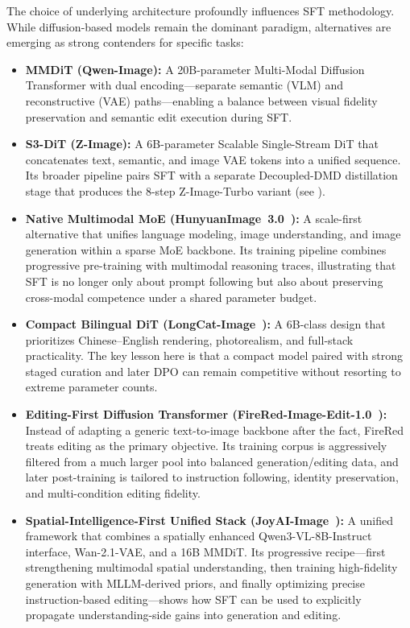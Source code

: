 The choice of underlying architecture profoundly influences SFT methodology. While diffusion-based models remain the dominant paradigm, alternatives are emerging as strong contenders for specific tasks:
\begin{itemize}[leftmargin=*,itemsep=2pt]
    \item \textbf{MMDiT (Qwen-Image):} A 20B-parameter Multi-Modal Diffusion Transformer with dual encoding---separate semantic (VLM) and reconstructive (VAE) paths---enabling a balance between visual fidelity preservation and semantic edit execution during SFT.
    \item \textbf{S3-DiT (Z-Image):} A 6B-parameter Scalable Single-Stream DiT that concatenates text, semantic, and image VAE tokens into a unified sequence. Its broader pipeline pairs SFT with a separate Decoupled-DMD distillation stage that produces the 8-step Z-Image-Turbo variant (see ).
    \item \textbf{Native Multimodal MoE (HunyuanImage~3.0~\citep{cao2025hunyuanimage}):} A scale-first alternative that unifies language modeling, image understanding, and image generation within a sparse MoE backbone. Its training pipeline combines progressive pre-training with multimodal reasoning traces, illustrating that SFT is no longer only about prompt following but also about preserving cross-modal competence under a shared parameter budget.
    \item \textbf{Compact Bilingual DiT (LongCat-Image~\citep{team2025longcat}):} A 6B-class design that prioritizes Chinese--English rendering, photorealism, and full-stack practicality. The key lesson here is that a compact model paired with strong staged curation and later DPO can remain competitive without resorting to extreme parameter counts.
    \item \textbf{Editing-First Diffusion Transformer (FireRed-Image-Edit-1.0~\citep{team2026firered}):} Instead of adapting a generic text-to-image backbone after the fact, FireRed treats editing as the primary objective. Its training corpus is aggressively filtered from a much larger pool into balanced generation/editing data, and later post-training is tailored to instruction following, identity preservation, and multi-condition editing fidelity.
    \item \textbf{Spatial-Intelligence-First Unified Stack (JoyAI-Image~\citep{jdjoyaiimage}):} A unified framework that combines a spatially enhanced Qwen3-VL-8B-Instruct interface, Wan-2.1-VAE, and a 16B MMDiT. Its progressive recipe---first strengthening multimodal spatial understanding, then training high-fidelity generation with MLLM-derived priors, and finally optimizing precise instruction-based editing---shows how SFT can be used to explicitly propagate understanding-side gains into generation and editing.

\end{itemize}
